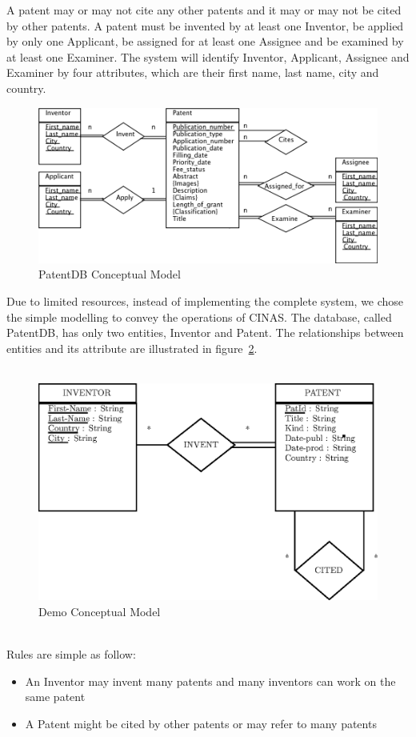 \documentclass{article}
\begin{document}
A patent may or may not cite any other patents and it may or may not be cited by other patents. A patent must be invented by at least one Inventor, be applied by only one Applicant, be assigned for at least one Assignee and be examined by at least one Examiner. The system will identify Inventor, Applicant, Assignee and Examiner by four attributes, which are their first name, last name, city and country.
\begin{figure}[h!]
\centering
\includegraphics[width=\textwidth]{erd.png}
\caption{ PatentDB Conceptual Model} \label{fig:erd}
\end{figure}\par
Due to limited resources, instead of implementing the complete system, we chose the simple modelling to convey the operations of CINAS. The database, called PatentDB, has only two entities, Inventor and Patent. The relationships between entities and its attribute are illustrated in figure~\ref{fig:conceptual}.\\~\\
\begin{figure}[h!]
\centering
\includegraphics[width=\textwidth]{conceptual_model.eps}
\caption{ Demo Conceptual Model} \label{fig:conceptual}
\end{figure}\par~\\
Rules are simple as follow:
\begin{itemize}
  \item An Inventor may invent many patents and many inventors can work on the same patent
  \item A Patent might be cited by other patents or may refer to many patents
\end{itemize}
\end{document}
